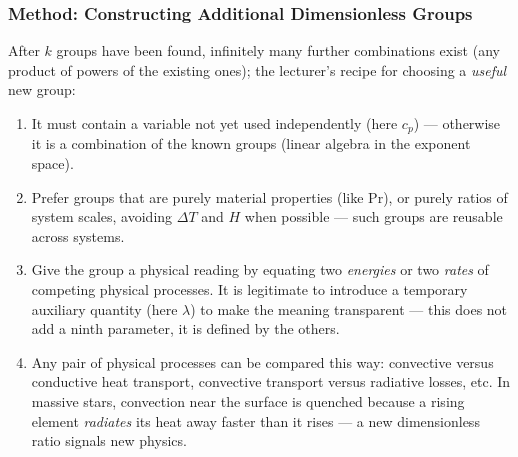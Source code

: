 
\subsubsection*{Method: Constructing Additional Dimensionless Groups}
After $k$ groups have been found, infinitely many further combinations exist
(any product of powers of the existing ones); the lecturer's recipe for
choosing a \emph{useful} new group:
\begin{enumerate}
    \item It must contain a variable not yet used independently (here $c_p$)
    --- otherwise it is a combination of the known groups (linear algebra in
    the exponent space).
    \item Prefer groups that are purely material properties (like
    $\mathrm{Pr}$), or purely ratios of system scales, avoiding $\Delta T$ and
    $H$ when possible --- such groups are reusable across systems.
    \item Give the group a physical reading by equating two \emph{energies} or
    two \emph{rates} of competing physical processes. It is legitimate to
    introduce a temporary auxiliary quantity (here $\lambda$) to make the
    meaning transparent --- this does not add a ninth parameter, it is defined
    by the others.
    \item Any pair of physical processes can be compared this way: convective
    versus conductive heat transport, convective transport versus radiative
    losses, etc. In massive stars, convection near the surface is quenched
    because a rising element \emph{radiates} its heat away faster than it
    rises --- a new dimensionless ratio signals new physics.
\end{enumerate}


